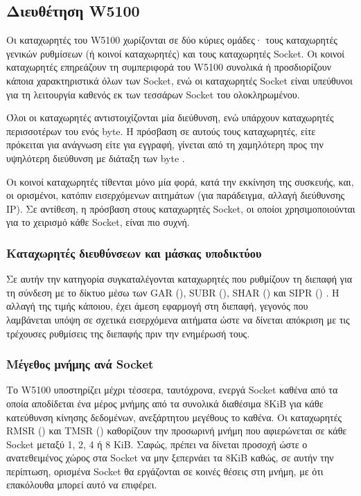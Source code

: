 \subsection{Διευθέτηση W5100}
\label{subsec:network:register}

Οι καταχωρητές του W5100 χωρίζονται σε δύο κύριες ομάδες· τους καταχωρητές
γενικών ρυθμίσεων (ή κοινοί καταχωρητές) και τους καταχωρητές Socket. Οι κοινοί
καταχωρητές επηρεάζουν τη συμπεριφορά του W5100 συνολικά ή προσδιορίζουν κάποια
χαρακτηριστικά όλων των Socket, ενώ οι καταχωρητές Socket είναι υπεύθυνοι για
τη λειτουργία καθενός εκ των τεσσάρων Socket του ολοκληρωμένου.

Όλοι οι καταχωρητές αντιστοιχίζονται μία διεύθυνση, ενώ υπάρχουν καταχωρητές
περισσοτέρων του ενός byte. Η πρόσβαση σε αυτούς τους καταχωρητές, είτε
πρόκειται για ανάγνωση είτε για εγγραφή, γίνεται από τη χαμηλότερη προς την
υψηλότερη διεύθυνση με  διάταξη των byte
\parencite[32--33,35]{wiz11:w5100}.

Οι κοινοί καταχωρητές τίθενται μόνο μία φορά, κατά την εκκίνηση της συσκευής,
και, οι ορισμένοι, κατόπιν εισερχόμενων αιτημάτων (για παράδειγμα, αλλαγή
διεύθυνσης IP). Σε αντίθεση, η πρόσβαση στους καταχωρητές Socket, οι οποίοι
χρησιμοποιούνται για το χειρισμό κάθε Socket, είναι πιο συχνή.


\subsubsection{Καταχωρητές διευθύνσεων και μάσκας υποδικτύου}
\label{ssubsec:network:addr-registers}

Σε αυτήν την κατηγορία συγκαταλέγονται καταχωρητές που ρυθμίζουν τη διεπαφή για
τη σύνδεση με το δίκτυο μέσω των GAR (),
SUBR (), SHAR ()
και SIPR () \parencite[20]{wiz11:w5100}. Η αλλαγή
της τιμής κάποιου, έχει άμεση εφαρμογή στη διεπαφή, γεγονός που λαμβάνεται υπόψη
σε σχετικά εισερχόμενα αιτήματα ώστε να δίνεται απόκριση με τις τρέχουσες
ρυθμίσεις της διεπαφής πριν την ενημέρωσή τους.


\subsubsection{Μέγεθος μνήμης ανά Socket}
\label{ssubsec:network:rmsr_tmsr}

Το W5100 υποστηρίζει μέχρι τέσσερα, ταυτόχρονα, ενεργά Socket καθένα από τα
οποία αποδίδεται ένα μέρος μνήμης από τα συνολικά διαθέσιμα 8KiB για κάθε
κατεύθυνση κίνησης δεδομένων, ανεξάρτητου μεγέθους το καθένα. Οι καταχωρητές
RMSR () και TMSR ()
καθορίζουν την προσωρινή μνήμη που αφιερώνεται σε κάθε Socket μεταξύ 1, 2, 4 ή 8
KiB. Σαφώς, πρέπει να δίνεται προσοχή ώστε ο ανατεθειμένος χώρος στα Socket
να μην ξεπερνάει τα 8KiB καθώς, σε αυτήν την περίπτωση, ορισμένα Socket θα
εργάζονται σε κοινές θέσεις στη μνήμη, με ότι επακόλουθα μπορεί αυτό να
επιφέρει.

